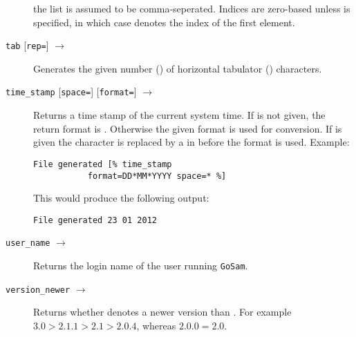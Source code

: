 \documentclass[11pt,a4paper]{refrep}
\newcommand{\golem}{{\tt GoSam}\xspace}
\begin{document}
\begin{description}
   the list is assumed to be comma-seperated. Indices are zero-based
   unless  is specified, in which case 
   denotes the index of the first element.
\item[\texttt{tab} {[\texttt{rep=}\synt{rep}]} $\to$ \synt{string}]
   Generates the given
   number () of horizontal tabulator (\lit{\\t}) characters.
\item[\texttt{time\_stamp} {[\texttt{space=}\synt{char}]}
   {[\texttt{format=}\synt{format}]} $\to$ \synt{string}]
   Returns a time stamp of the current system time. If  is
   not given, the return format is . Otherwise the given
   format is used for conversion. If  is given the
   character  is replaced by a \lit{ } in  before
   the format is used. Example:
\begin{lstlisting}
File generated [% time_stamp 
           format=DD*MM*YYYY space=* %]
\end{lstlisting}
   This would produce the following output:
\begin{lstlisting}
File generated 23 01 2012
\end{lstlisting}
\item[\texttt{user\_name} $\to$ \synt{string}]
   Returns the login name of the user running \golem{}.
\item[\texttt{version\_newer} \synt{version$_1$} \synt{version$_2$}
   $\to$ \synt{logical}]
   Returns whether  denotes a newer version than
   . For example $3.0>2.1.1>2.1>2.0.4$, whereas
   $2.0.0=2.0$.
\end{description}
\end{document}
